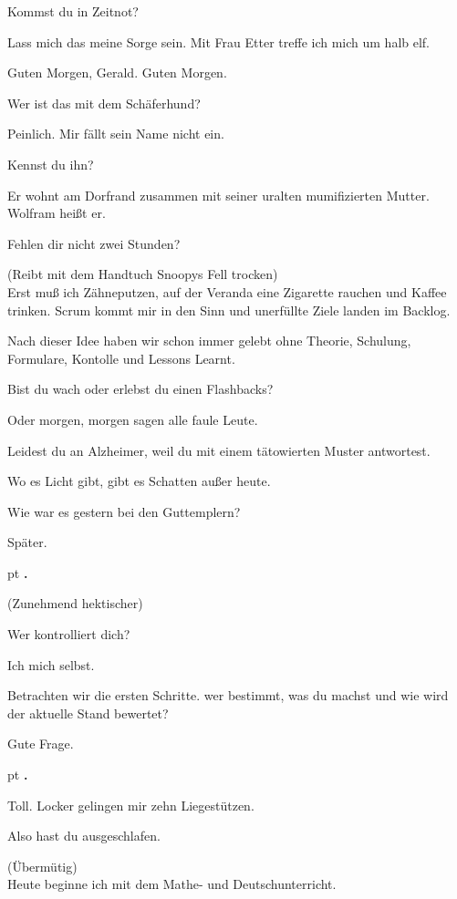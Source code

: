 \documentclass[10pt,a4paper]{article}
\newcounter{notec}
\newcommand\notep[1]{%
  \stepcounter{notec}
  \vskip #1pt
  {\bf\arabic{notec}.}
}
\begin{document}
\begin{mdframed}[style=daystyle]
  \vskip 2pt
  Kommst du in Zeitnot?
  
  \vskip 2pt
  Lass mich das meine Sorge sein. Mit Frau Etter treffe ich mich um halb elf.
  
  \vskip 2pt
  Guten Morgen, Gerald.
  Guten Morgen.
  
  \vskip 2pt
  Wer ist das mit dem Schäferhund?
  
  \vskip 2pt
  Peinlich. Mir fällt sein Name nicht ein.
  
  \vskip 2pt
  Kennst du ihn?
  
  \vskip 2pt
  Er wohnt am Dorfrand zusammen mit seiner uralten mumifizierten Mutter.
  Wolfram heißt er.
  
  \vskip 2pt
  Fehlen dir nicht zwei Stunden?
  
  \vskip 2pt
  (Reibt mit dem Handtuch Snoopys Fell trocken) \\
  Erst muß ich Zähneputzen, auf der Veranda eine Zigarette rauchen und Kaffee
  trinken.
  Scrum kommt mir in den Sinn und unerfüllte Ziele landen im Backlog.
  
  \vskip 2pt
  Nach dieser Idee haben wir schon immer gelebt ohne Theorie, Schulung,
  Formulare, Kontolle und Lessons Learnt.
  
  \vskip 2pt
  Bist du wach oder erlebst du einen Flashbacks?
  
  \vskip 2pt
  Oder morgen, morgen sagen alle faule Leute.
  
  \vskip 2pt
  Leidest du an Alzheimer, weil du mit einem tätowierten Muster antwortest.
  
  \vskip 2pt
  Wo es Licht gibt, gibt es Schatten außer heute.
  
  \vskip 2pt
  Wie war es gestern bei den Guttemplern?
  
  \vskip 2pt
  Später.
  
  \notep 4
  (Zunehmend hektischer)
  
  \vskip 2pt
  Wer kontrolliert dich?
  
  \vskip 2pt
  Ich mich selbst.
  
  \vskip 2pt
  Betrachten wir die ersten Schritte. wer bestimmt, was du machst und wie wird
  der aktuelle Stand bewertet?
  
  \vskip 2pt
  Gute Frage.

  
  \notep 4
  Toll. Locker gelingen mir zehn Liegestützen.
  
  \vskip 2pt
  Also hast du ausgeschlafen.
  
  \vskip 2pt
  (Übermütig) \\
  Heute beginne ich mit dem Mathe- und Deutschunterricht.
  

\end{mdframed}
\end{document}
